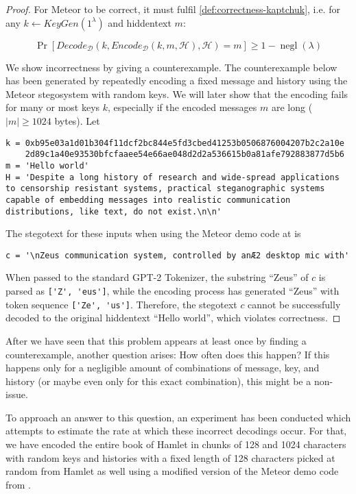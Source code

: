 \begin{proof}
For Meteor to be correct, it must fulfil \autoref{def:correctness-kaptchuk}, i.e. for any $k \leftarrow KeyGen(1^\lambda)$ and hiddentext $m$:

$$\mathop{Pr}[Decode_{\mathcal{D}}(k, Encode_{\mathcal{D}}(k, m, \mathcal{H}), \mathcal{H}) = m] \geq 1 - \mathop{negl}(\lambda)$$

We show incorrectness by giving a counterexample. 
The counterexample below has been generated by repeatedly encoding a fixed message and history using the Meteor stegosystem with random keys.
We will later show that the encoding fails for many or most keys $k$, especially if the encoded messages $m$ are long ($|m| \geq 1024$ bytes).
Let

\begin{lstlisting}[breaklines]
k = 0xb95e03a1d01b304f11dcf2bc844e5fd3cbed41253b0506876004207b2c2a10e
    2d89c1a40e93530bfcfaaee54e66ae048d2d2a536615b0a81afe792883877d5b6
m = 'Hello world'
H = 'Despite a long history of research and wide-spread applications to censorship resistant systems, practical steganographic systems capable of embedding messages into realistic communication distributions, like text, do not exist.\n\n'
\end{lstlisting}

The stegotext for these inputs when using the Meteor demo code at \cite{MeteorDemo2021} is

\begin{lstlisting}
c = '\nZeus communication system, controlled by anÆ2 desktop mic with'
\end{lstlisting}

When passed to the standard GPT-2 Tokenizer, the substring ``Zeus'' of $c$ is parsed as \lstinline{['Z', 'eus']}, while the encoding process has generated ``Zeus'' with token sequence \lstinline{['Ze', 'us']}.
Therefore, the stegotext $c$ cannot be successfully decoded to the original hiddentext ``Hello world'', which violates correctness.
\end{proof}

After we have seen that this problem appears at least once by finding a counterexample, another question arises:
How often does this happen?
If this happens only for a negligible amount of combinations of message, key, and history (or maybe even only for this exact combination), this might be a non-issue.

To approach an answer to this question, an experiment has been conducted which attempts to estimate the rate at which these incorrect decodings occur.
For that, we have encoded the entire book of Hamlet in chunks of 128 and 1024 characters with random keys and histories with a fixed length of 128 characters picked at random from Hamlet as well using a modified version of the Meteor demo code from \cite{MeteorDemo2021}.

